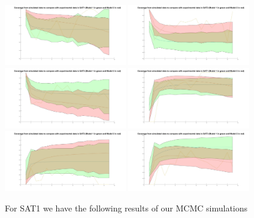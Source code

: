 \documentclass[11pt,letterpaper]{amsart}
\theoremstyle{plain}
\theoremstyle{definition}
\theoremstyle{remark}
\begin{document}
\begin{center}
\includegraphics[width=0.4\textwidth]{fig11.jpg}
\includegraphics[width=0.4\textwidth]{fig12.jpg}
\includegraphics[width=0.4\textwidth]{fig13.jpg}
\includegraphics[width=0.4\textwidth]{fig14.jpg}
\includegraphics[width=0.4\textwidth]{fig15.jpg}
\includegraphics[width=0.4\textwidth]{fig16.jpg}
\end{center}
For SAT1 we have the following results of our MCMC simulations
\end{document}
